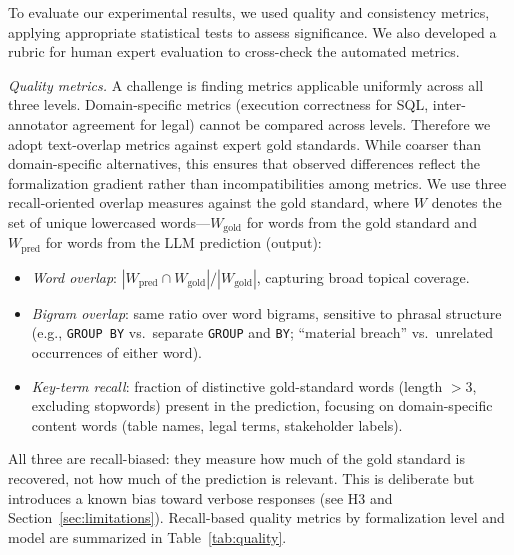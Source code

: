 \documentclass[runningheads]{llncs}
\begin{document}
To evaluate our experimental results, we used quality and consistency metrics, applying appropriate statistical tests to assess significance.  We also developed a rubric for human expert evaluation to cross-check the automated metrics.


\vspace{5pt}
\noindent
\textit{Quality metrics.}
A challenge is finding metrics applicable uniformly across all three levels. Domain-specific metrics (execution correctness for SQL, inter-anno\-ta\-tor agreement for legal) cannot be compared across levels. Therefore we adopt text-overlap metrics against expert gold standards. While coarser than domain-specific alternatives, this ensures that observed differences reflect the formalization gradient rather than incompatibilities among metrics. We use three recall-oriented overlap measures against the gold standard, where $W$ denotes the set of unique lowercased words---$W_{\text{gold}}$ for words from the gold standard and $W_{\text{pred}}$ for words from the LLM prediction (output):
\begin{itemize}[itemsep=4pt]
  \item \textit{Word overlap}: $|W_{\text{pred}} \cap W_{\text{gold}}| / |W_{\text{gold}}|$, capturing broad topical coverage.
  \item \textit{Bigram overlap}: same ratio over word bigrams, sensitive to phrasal structure (e.g., \texttt{GROUP BY} vs.\ separate \texttt{GROUP} and \texttt{BY}; ``material breach'' vs.\ unrelated occurrences of either word).
  \item \textit{Key-term recall}: fraction of distinctive gold-standard words (length $>3$, excluding stopwords) present in the prediction, focusing on domain-specific content words (table names, legal terms, stakeholder labels).
\end{itemize}
All three are recall-biased: they measure how much of the gold standard is recovered, not how much of the prediction is relevant. This is deliberate but introduces a known bias toward verbose responses (see H3 and Section~\ref{sec:limitations}). Recall-based quality metrics by formalization level and model are summarized in Table~\ref{tab:quality}.
\end{document}
